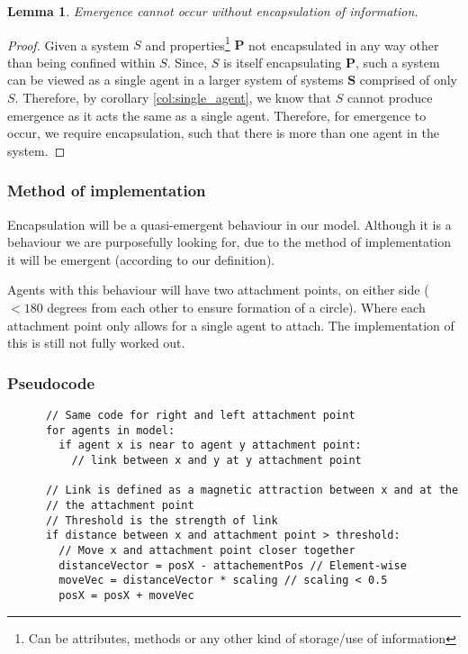 \documentclass{article}
\newtheorem{lemma}[theorem]{Lemma}
\begin{document}
      \begin{lemma}
        Emergence cannot occur without encapsulation of information.
      \end{lemma}
      \begin{proof}
        
        Given a system $S$ and properties\footnote{Can be attributes, methods or  any other kind of storage/use of information} $\bm{P}$ not encapsulated in any way other than being confined within $S$. Since, $S$ is itself encapsulating $\bm{P}$, such a system can be viewed as a single agent in a larger system of systems $\bm{S}$ comprised of only $S$. Therefore, by corollary \ref{col:single_agent}, we know that $S$ cannot produce emergence as it acts the same as a single agent. Therefore, for emergence to occur, we require encapsulation, such that there is more than one agent in the system. 

      \end{proof}

    \subsubsection{Method of implementation}
      
      Encapsulation will be a quasi-emergent behaviour in our model. Although it is a behaviour we are purposefully looking for, due to the method of implementation it will be emergent (according to our definition).

      Agents with this behaviour will have two attachment points, on either side ($<180$ degrees from each other to ensure formation of a circle). Where each attachment point only allows for a single agent to attach. The implementation of this is still not fully worked out.

    \subsubsection{Pseudocode}

      \begin{verbatim}
      // Same code for right and left attachment point
      for agents in model:
        if agent x is near to agent y attachment point:
          // link between x and y at y attachment point

      // Link is defined as a magnetic attraction between x and at the
      // the attachment point
      // Threshold is the strength of link
      if distance between x and attachment point > threshold:
        // Move x and attachment point closer together
        distanceVector = posX - attachementPos // Element-wise 
        moveVec = distanceVector * scaling // scaling < 0.5
        posX = posX + moveVec
      \end{verbatim}
\end{document}
